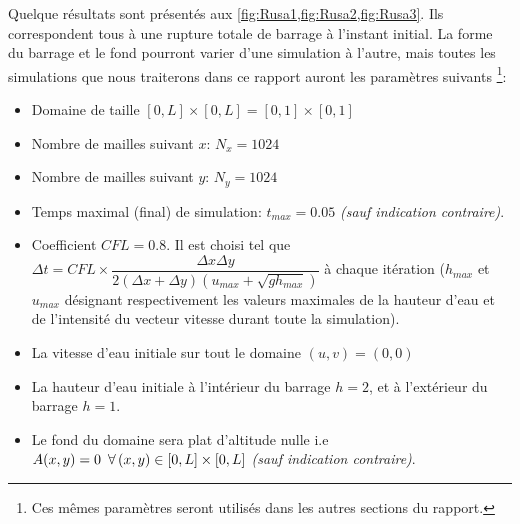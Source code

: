 \documentclass[
	french,
	11pt, %
]{fphw}
\newcommand{\hquad}{\hspace{0.5em}} %
\begin{document}
\noindent Quelque résultats sont présentés aux \cref{fig:Rusa1,fig:Rusa2,fig:Rusa3}. Ils correspondent tous à une rupture totale de barrage à l'instant initial. La forme du barrage et le fond pourront varier d'une simulation à l'autre, mais toutes les simulations que nous traiterons dans ce rapport auront les paramètres suivants \footnote{Ces mêmes paramètres seront utilisés dans les autres sections du rapport.}: 
\begin{itemize}
	\item Domaine de taille $[0,L]\times[0,L] = [0,1]\times[0,1]$
	\item Nombre de mailles suivant $x$: $N_x = 1024$
	\item Nombre de mailles suivant $y$: $N_y = 1024$
	\item Temps maximal (final) de simulation: $t_{max} = 0.05$ \textit{(sauf indication contraire)}.
	\item Coefficient $CFL = 0.8$. Il est choisi tel que $\Delta t = CFL \times \dfrac{\Delta x \Delta y}{2(\Delta x + \Delta y)\left( u_{max} + \sqrt{gh_{max}} \right)}$ à chaque itération ($h_{max}$ et $u_{max}$ désignant respectivement les valeurs maximales de la hauteur d'eau et de l'intensité du vecteur vitesse durant toute la simulation).
	\item La vitesse d'eau initiale sur tout le domaine $(u,v) = (0,0)$
	\item La hauteur d'eau initiale à l'intérieur du barrage $h=2$, et à l'extérieur du barrage $h=1$. 
	\item Le fond du domaine sera plat d'altitude nulle i.e $A(x,y)=0 \hquad \forall \, (x,y)\in[0,L]\times[0,L]$ \textit{(sauf indication contraire)}.
\end{itemize} 
\end{document}
